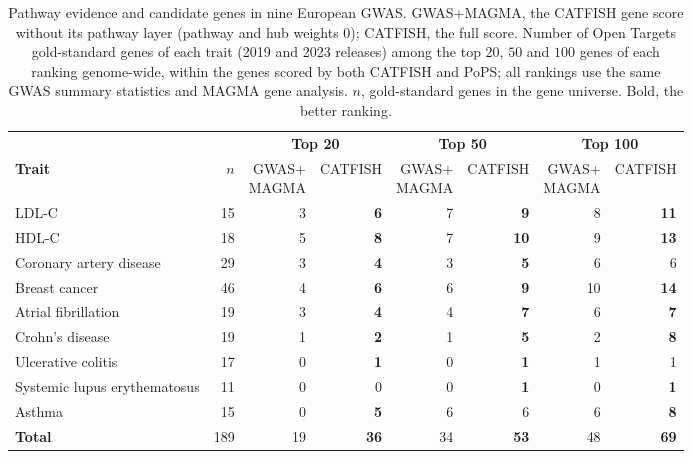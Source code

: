 \begin{table}[!htbp]
\centering
\caption{Pathway evidence and candidate genes in nine European GWAS. GWAS+MAGMA, the CATFISH gene score without its pathway layer (pathway and hub weights $0$); CATFISH, the full score. Number of Open Targets gold-standard genes of each trait (2019 and 2023 releases) among the top $20$, $50$ and $100$ genes of each ranking genome-wide, within the genes scored by both CATFISH and PoPS; all rankings use the same GWAS summary statistics and MAGMA gene analysis. $n$, gold-standard genes in the gene universe. Bold, the better ranking.}
\label{tab:pathway_gain_all}
\small
\setlength{\tabcolsep}{4pt}
\begin{tabular*}{\linewidth}{@{\extracolsep{\fill}}lrrrrrrr}
\hline
 & & \multicolumn{2}{c}{\textbf{Top 20}} & \multicolumn{2}{c}{\textbf{Top 50}} & \multicolumn{2}{c}{\textbf{Top 100}} \\
\textbf{Trait} & $n$ & \makecell{GWAS+\\MAGMA} & CATFISH & \makecell{GWAS+\\MAGMA} & CATFISH & \makecell{GWAS+\\MAGMA} & CATFISH \\
\hline
LDL-C & 15 & 3 & \textbf{6} & 7 & \textbf{9} & 8 & \textbf{11} \\
HDL-C & 18 & 5 & \textbf{8} & 7 & \textbf{10} & 9 & \textbf{13} \\
Coronary artery disease & 29 & 3 & \textbf{4} & 3 & \textbf{5} & 6 & 6 \\
Breast cancer & 46 & 4 & \textbf{6} & 6 & \textbf{9} & 10 & \textbf{14} \\
Atrial fibrillation & 19 & 3 & \textbf{4} & 4 & \textbf{7} & 6 & \textbf{7} \\
Crohn's disease & 19 & 1 & \textbf{2} & 1 & \textbf{5} & 2 & \textbf{8} \\
Ulcerative colitis & 17 & 0 & \textbf{1} & 0 & \textbf{1} & 1 & 1 \\
Systemic lupus erythematosus & 11 & 0 & 0 & 0 & \textbf{1} & 0 & \textbf{1} \\
Asthma & 15 & 0 & \textbf{5} & 6 & 6 & 6 & \textbf{8} \\
\hline
\textbf{Total} & 189 & 19 & \textbf{36} & 34 & \textbf{53} & 48 & \textbf{69} \\
\hline
\end{tabular*}
\end{table}
